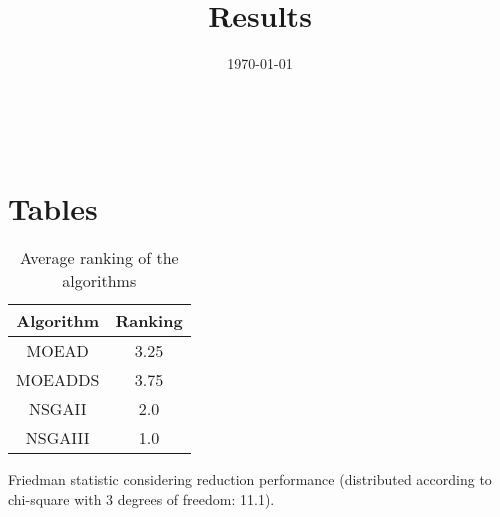 \documentclass{article}
\title{Results}
\author{}
\date{\today}
\begin{document}
\oddsidemargin 0in \topmargin 0in\maketitle
\
\section{Tables}
\begin{table}[!htp]
\centering
\caption{Average ranking of the algorithms}
\begin{tabular}{c|c}
Algorithm&Ranking\\
\hline
MOEAD&3.25\\
MOEADDS&3.75\\
NSGAII&2.0\\
NSGAIII&1.0\\
\end{tabular}
\end{table}


Friedman statistic considering reduction performance (distributed according to chi-square with 3 degrees of freedom: 11.1).
\end{document}
